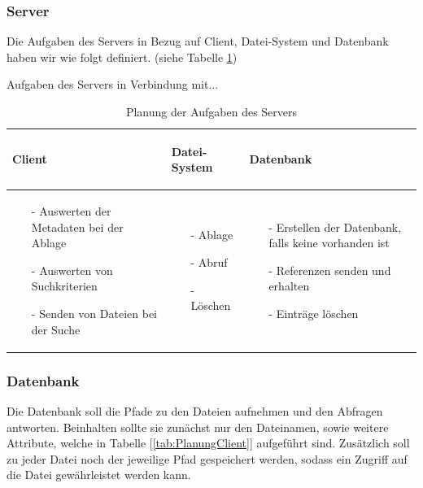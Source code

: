 \documentclass[12pt,a4paper,bibliography=totocnumbered,listof=totocnumbered]{scrartcl}
\begin{document}
\subsubsection{Server}
\label{sec:Server}
Die Aufgaben des Servers in Bezug auf Client, Datei-System und Datenbank haben wir wie folgt definiert. (siehe Tabelle \ref{tab:PlanungServer})

\vspace{1em}
\begin{table}[!h]
	\centering
	Aufgaben des Servers in Verbindung mit...\\
	\begin{tabular}{|p{4cm}|p{4cm}|p{4cm}|}
		\hline
			\begin{center}
				\textbf{Client}
			\end{center}
			&
			\begin{center}
				\textbf{Datei-System}
			\end{center}
			&
			\begin{center}
				\textbf{Datenbank}
			\end{center}
		\\
		\hline
			\begin{itemize}[]
				\item[-]Auswerten der Metadaten bei der Ablage
				\item[-]Auswerten von Suchkriterien
				\item[-]Senden von Dateien bei der Suche
			\end{itemize}
			&
			\begin{itemize}[]
				\item[-]Ablage
				\item[-]Abruf
				\item[-]Löschen
			\end{itemize}
			&
			\begin{itemize}[]
				\item[-]Erstellen der Datenbank, falls keine vorhanden ist
				\item[-]Referenzen senden und erhalten
				\item[-]Einträge löschen
			\end{itemize}
		\\
		\hline
	\end{tabular}
	\caption{Planung der Aufgaben des Servers}
	\label{tab:PlanungServer}
\end{table}

\subsubsection{Datenbank}
\label{sec:Datenbank}
Die Datenbank soll die Pfade zu den Dateien aufnehmen und den Abfragen antworten. Beinhalten sollte sie zunächst nur den Dateinamen, sowie weitere Attribute, welche in Tabelle [\ref{tab:PlanungClient}] aufgeführt sind. Zusätzlich soll zu jeder Datei noch der jeweilige  Pfad gespeichert werden, sodass ein Zugriff auf die Datei gewährleistet werden kann.
\end{document}
